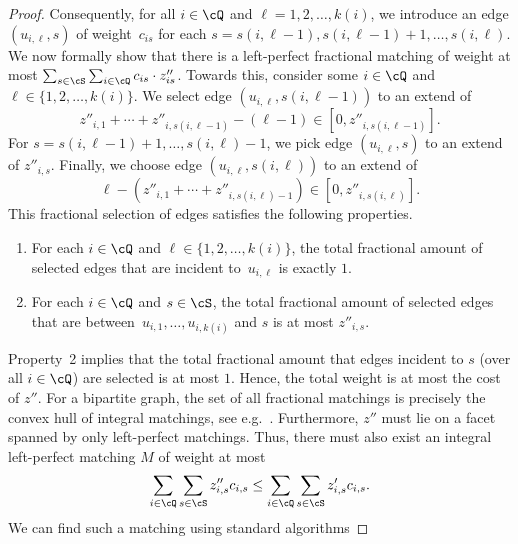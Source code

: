 \documentclass[a4paper,USenglish,cleveref,thm-restate]{lipics-v2021}
\begin{document}
\begin{proof}
    Consequently, for all $i\in\cQ$ and $\ell=1,2,\dotsc,k(i)$, we
    introduce an edge $(u_{i,\ell}, s)$ of weight~$c_{is}$ for
    each $s = s(i,\ell-1),s(i,\ell-1)+1,\dotsc,s(i,\ell)$.
    We now formally show that there is a left-perfect
    fractional matching
    of weight at most $\sum_{s\in\cS}\sum_{i\in\cQ}c_{is} \cdot z''_{is}$.
    Towards this,
    consider some $i\in \cQ$ and $\ell \in \{1,2,\dotsc,k(i)\}$.
    We select edge $(u_{i,\ell}, s(i, \ell-1))$ to an
    extend of
    \begin{equation*}
         z''_{i,1} + \cdots + z''_{i,s(i, \ell-1)} - (\ell - 1) \in [0, z''_{i,s(i, \ell-1)}].
    \end{equation*}
    For $s = s(i, \ell-1)+1,\dotsc,s(i, \ell)-1$, we pick edge $(u_{i,\ell}, s)$ to an extend of $z''_{i,s}$.
    Finally, we choose edge $(u_{i,\ell}, s(i, \ell))$ to an
    extend of
    \begin{equation*}
        \ell - (z''_{i,1} + \cdots + z''_{i,s(i, \ell)-1}) \in [0, z''_{i,s(i, \ell)}] .
    \end{equation*}
    This fractional selection of edges satisfies the following properties.
    \smallskip
    \begin{enumerate}
        \item For each $i\in\cQ$ and $\ell\in\{1,2,\dotsc,k(i)\}$, the total fractional amount of selected 
        edges that are incident to~$u_{i,\ell}$ 
        is exactly $1$.
        \item For each $i\in\cQ$ and $s\in\cS$,
        the total fractional amount of selected edges that are between~$u_{i,1},\dotsc,u_{i,k(i)}$ and $s$
        is at most $z''_{i,s}$.
    \end{enumerate}
    Property~2 implies that the total fractional amount that edges incident to $s$ (over all $i\in\cQ$) are selected is at most $1$.
    Hence, the total weight is
    at most the cost of $z''$.
    For a bipartite graph, the set of all fractional
    matchings is precisely the convex hull of integral
    matchings, see e.g.~\cite[Chapter~18]{schrijver2003combinatorial}. Furthermore, $z''$ must lie on a facet spanned by only left-perfect
    matchings.
    Thus, there must also
    exist an integral left-perfect matching $M$ of weight at most
    \begin{equation*}
        \sum_{i\in\cQ} \sum_{s\in\cS} z''_{i, s} c_{i, s}
        \le \sum_{i\in\cQ} \sum_{s\in\cS} z'_{i, s} c_{i, s} .
    \end{equation*}
    We can find such a matching using standard algorithms

\end{proof}
\end{document}
